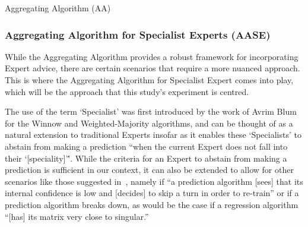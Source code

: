 \begin{algorithm}[ht]
    \caption{Aggregating Algorithm (AA)}\label{algorithm:aggregationg_algorithm}
    \begin{algorithmic}[1]
    \end{algorithmic}
\end{algorithm}

\subsubsection{Aggregating Algorithm for Specialist Experts (AASE)}\label{subsubsection:aggregating_algorithm_for_specialist_experts}
While the Aggregating Algorithm provides a robust framework for incorporating Expert advice, there are certain scenarios that require a more nuanced approach. This is where the Aggregating Algorithm for Specialist Expert comes into play, which will be the approach that this study's experiment is centred.

The use of the term `Specialist' was first introduced by the work of Avrim Blum~\cite{blum:1997} for the Winnow and Weighted-Majority algorithms, and can be thought of as a natural extension to traditional Experts insofar as it enables these `Specialists' to abstain from making a prediction ``when the current Expert does not fall into their `[speciality]'\''. While the criteria for an Expert to abstain from making a prediction is sufficient in our context, it can also be extended to allow for other scenarios like those suggested in~\cite{kalnishkan:2022}, namely if ``a prediction algorithm [sees] that its internal confidence is low and [decides] to skip a turn in order to re-train'' or if a prediction algorithm breaks down, as would be the case if a regression algorithm ``[has] its matrix very close to singular.''

